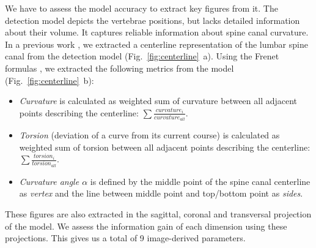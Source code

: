 \documentclass[a4paper,twoside]{style/article}
\newcommand{\com}[1]{\textcolor{orange}{\uline{#1}}}
\begin{document}
We have to assess the model accuracy to extract key figures from it.
The detection model depicts the vertebrae positions, but lacks detailed information about their volume.
It captures reliable information about spine canal curvature.
In a previous work \cite{Klemm2013VMV,Klemm2014VIS}, we extracted a centerline representation of the lumbar spine canal from the detection model (Fig.~\ref{fig:centerline}~a).
Using the Frenet formulas \cite{Frenet}, we extracted the following metrics from the model (Fig.~\ref{fig:centerline}~b):
\begin{itemize}
	\item \emph{Curvature} is calculated as weighted sum of curvature between all adjacent points describing the centerline: $\sum \frac{curvature_i}{curvature_{all}}$.
	\item \emph{Torsion} (deviation of a curve from its current course) is calculated as weighted sum of torsion between all adjacent points describing the centerline: $\sum \frac{torsion_i}{torsion_{all}}$.
	\item \emph{Curvature angle $\alpha$} is defined by the middle point of the spine canal centerline as \emph{vertex} and the line between middle point and top/bottom point as \emph{sides}.
\end{itemize}
These figures are also extracted in the sagittal, coronal and transversal projection of the model.
We assess the information gain of each dimension using these projections.
This gives us a total of 9 image-derived parameters.


\end{document}
